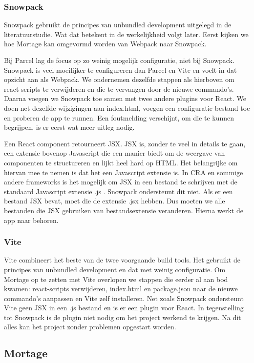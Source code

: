 \subsubsection{Snowpack}
Snowpack gebruikt de principes van unbundled development uitgelegd in de literatuurstudie. Wat dat betekent in de werkelijkheid volgt later. Eerst kijken we hoe Mortage kan omgevormd worden van Webpack naar Snowpack. 

Bij Parcel lag de focus op zo weinig mogelijk configuratie, niet bij Snowpack. Snowpack is veel moeilijker te configureren dan Parcel en Vite en voelt in dat opzicht aan als Webpack. We ondernemen dezelfde stappen als hierboven om react-scripts te verwijderen en die te vervangen door de nieuwe commando’s. Daarna voegen we Snowpack toe samen met twee andere plugins voor React. We doen net dezelfde wijzigingen aan index.html, voegen een configuratie bestand toe en proberen de app te runnen. Een foutmelding verschijnt, om die te kunnen begrijpen, is er eerst wat meer uitleg nodig.

Een React component retourneert JSX. JSX is, zonder te veel in details te gaan, een extensie bovenop Javascript die een manier biedt om de weergave van componenten te structureren en lijkt heel hard op HTML. Het belangrijke om hiervan mee te nemen is dat het een Javascript extensie is. In CRA en sommige andere frameworks is het mogelijk om JSX in een bestand te schrijven met de standaard Javascript extensie .js . Snowpack ondersteunt dit niet. Als er een bestand JSX bevat, moet die de extensie .jsx hebben. Dus moeten we alle bestanden die JSX gebruiken van bestandsextensie veranderen. Hierna werkt de app naar behoren. 

\subsubsection{Vite}
Vite combineert het beste van de twee voorgaande build tools. Het gebruikt de principes van unbundled development en dat met weinig configuratie. Om Mortage op te zetten met Vite overlopen we stappen die eerder al aan bod kwamen: react-scripts verwijderen, index.html en package.json naar de nieuwe commando’s aanpassen en Vite zelf installeren. Net zoals Snowpack ondersteunt Vite geen JSX in een .js bestand en is er een plugin voor React. In tegenstelling tot Snowpack is de plugin niet nodig om het project werkend te krijgen. Na dit alles kan het project zonder problemen opgestart worden. 

\subsection{Mortage}

